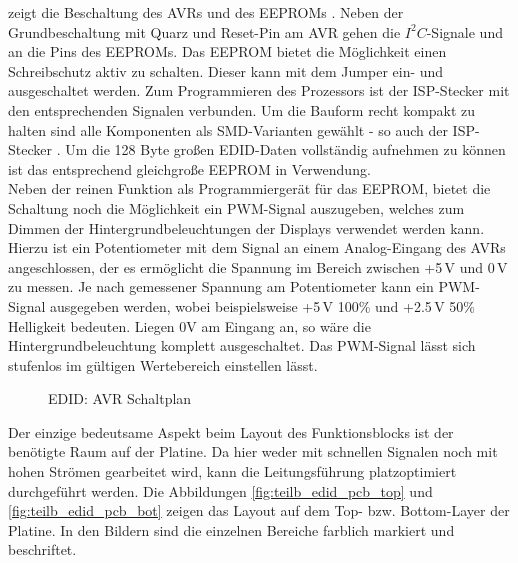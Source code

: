  zeigt die Beschaltung des AVRs  und des EEPROMs . Neben der Grundbeschaltung mit Quarz und Reset-Pin am AVR gehen die $I^2C$-Signale  und  an die Pins des EEPROMs. Das EEPROM bietet die Möglichkeit einen Schreibschutz aktiv zu schalten. 
Dieser kann mit dem Jumper  ein- und ausgeschaltet werden. Zum Programmieren des Prozessors ist der ISP-Stecker mit den entsprechenden Signalen verbunden. Um die Bauform recht kompakt zu halten sind alle Komponenten als SMD-Varianten gewählt - so auch der ISP-Stecker . 
Um die 128 Byte großen EDID-Daten vollständig aufnehmen zu können ist das entsprechend gleichgroße EEPROM  in Verwendung. \\
Neben der reinen Funktion als Programmiergerät für das EEPROM, bietet die Schaltung noch die Möglichkeit ein PWM-Signal auszugeben, welches zum Dimmen der Hintergrundbeleuchtungen der Displays verwendet werden kann. 
Hierzu ist ein Potentiometer mit dem Signal  an einem Analog-Eingang des AVRs angeschlossen, der es ermöglicht die Spannung im Bereich zwischen +5\,V und 0\,V zu messen. 
Je nach gemessener Spannung am Potentiometer kann ein PWM-Signal  ausgegeben werden, wobei beispielsweise +5\,V 100\%  und +2.5\,V 50\% Helligkeit bedeuten. 
Liegen 0V am Eingang an, so wäre die Hintergrundbeleuchtung komplett ausgeschaltet. Das PWM-Signal lässt sich stufenlos im gültigen Wertebereich einstellen lässt. 
\begin{figure}[htbp]
	\center
    \caption{EDID: AVR Schaltplan}
    \label{fig:teilb_edid_avr_sch}
\end{figure}
Der einzige bedeutsame Aspekt beim Layout des Funktionsblocks ist der benötigte Raum auf der Platine. 
Da hier weder mit schnellen Signalen noch mit hohen Strömen gearbeitet wird, kann die Leitungsführung platzoptimiert durchgeführt werden. 
Die Abbildungen \ref{fig:teilb_edid_pcb_top} und \ref{fig:teilb_edid_pcb_bot} zeigen das Layout auf dem Top- bzw. Bottom-Layer der Platine. 
In den Bildern sind die einzelnen Bereiche farblich markiert und beschriftet.

